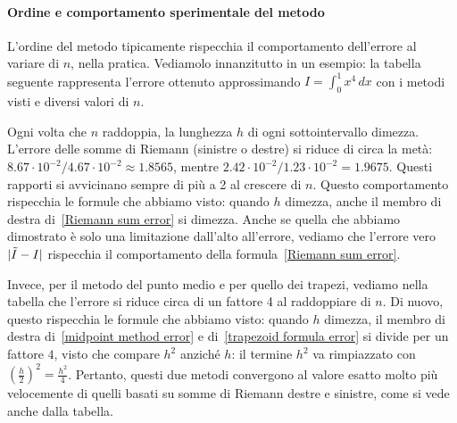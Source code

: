 \documentclass[a4paper]{report}
\DeclarePairedDelimiter{\abs}{\lvert}{\rvert}
\theoremstyle{definiton}
\theoremstyle{remark}
\begin{document}
\paragraph{Ordine e comportamento sperimentale del metodo}
L'ordine del metodo tipicamente rispecchia il comportamento dell'errore al variare di $n$, nella pratica. Vediamolo innanzitutto in un esempio: la tabella seguente rappresenta l'errore ottenuto approssimando $I=\int_0^1 x^4 \, dx$ con i metodi visti e diversi valori di $n$.
%
\begin{center}
\end{center}
%
Ogni volta che $n$ raddoppia, la lunghezza $h$ di ogni sottointervallo dimezza. L'errore delle somme di Riemann (sinistre o destre) si riduce di circa la metà: $8.67\cdot 10^{-2} / 4.67 \cdot 10^{-2} \approx 1.8565$, mentre $2.42\cdot 10^{-2} / 1.23 \cdot 10^{-2} = 1.9675$. Questi rapporti si avvicinano sempre di più a 2 al crescere di $n$. Questo comportamento rispecchia le formule che abbiamo visto: quando $h$ dimezza, anche il membro di destra di~\eqref{Riemann sum error} si dimezza. Anche se quella che abbiamo dimostrato è solo una limitazione dall'alto all'errore, vediamo che l'errore vero $\abs{\tilde{I}-I}$ rispecchia il comportamento della formula~\eqref{Riemann sum error}.

Invece, per il metodo del punto medio e per quello dei trapezi, vediamo nella tabella che l'errore si riduce circa di un fattore 4 al raddoppiare di $n$. Di nuovo, questo rispecchia le formule che abbiamo visto: quando $h$ dimezza, il membro di destra di~\eqref{midpoint method error} e di~\eqref{trapezoid formula error} si divide per un fattore $4$, visto che compare $h^2$ anziché $h$: il termine $h^2$ va rimpiazzato con $\left(\frac{h}{2}\right)^2 = \frac{h^2}{4}$. Pertanto, questi due metodi convergono al valore esatto molto più velocemente di quelli basati su somme di Riemann destre e sinistre, come si vede anche dalla tabella.
\end{document}
